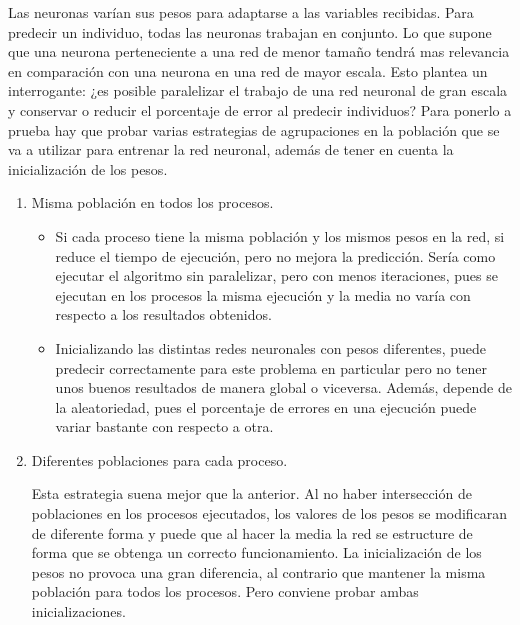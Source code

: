 	Las neuronas varían sus pesos para adaptarse a las variables recibidas. Para predecir un individuo, todas las neuronas trabajan en conjunto. Lo que supone que una neurona perteneciente a una red de menor tamaño tendrá mas relevancia en comparación con una neurona en una red de mayor escala. Esto plantea un interrogante: ¿es posible paralelizar el trabajo de una red neuronal de gran escala y conservar o reducir el porcentaje de error al predecir individuos? Para ponerlo a prueba hay que probar varias estrategias de agrupaciones en la población que se va a utilizar para entrenar la red neuronal, además de tener en cuenta la inicialización de los pesos.
	
	\begin{enumerate}
		\item Misma población en todos los procesos. 
		
		\begin{itemize}
			\item Si cada proceso tiene la misma población y los mismos pesos en la red, si reduce el tiempo de ejecución, pero no mejora la predicción. Sería como ejecutar el algoritmo sin paralelizar, pero con menos iteraciones, pues se ejecutan en los procesos la misma ejecución y la media no varía con respecto a los resultados obtenidos.
			\item Inicializando las distintas redes neuronales con pesos diferentes, puede predecir correctamente para este problema en particular pero no tener unos buenos resultados de manera global o viceversa. Además, depende de la aleatoriedad, pues el porcentaje de errores en una ejecución puede variar bastante con respecto a otra. 
		\end{itemize} 
		
		\item Diferentes poblaciones para cada proceso. 
		
		Esta estrategia suena mejor que la anterior. Al no haber intersección de poblaciones en los procesos ejecutados, los valores de los pesos se modificaran de diferente forma y puede que al hacer la media la red se estructure de forma que se obtenga un correcto funcionamiento. La inicialización de los pesos no provoca una gran diferencia, al contrario que mantener la misma población para todos los procesos. Pero conviene probar ambas inicializaciones.	
		
		
	\end{enumerate}	
	
	

	